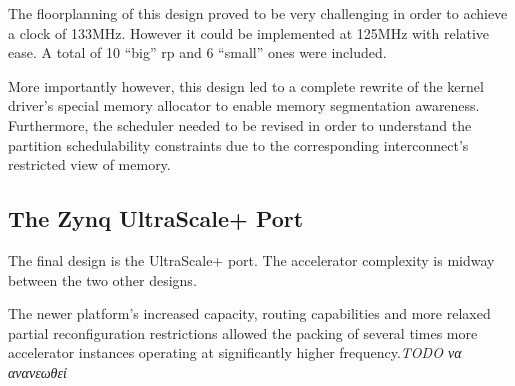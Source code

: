 The floorplanning of this design proved to be very challenging in order to achieve a clock of 133MHz.
However it could be implemented at 125MHz with relative ease. A total of 10 ``big'' \gls{rp} and
6 ``small'' ones were included.

More importantly however, this design led to a complete rewrite of the kernel driver's special memory allocator
to enable memory segmentation awareness. Furthermore, the scheduler needed to be revised in order to understand
the partition schedulability constraints due to the corresponding interconnect's restricted view of memory.


\subsection{The Zynq UltraScale+ Port}

The final design is the UltraScale+ port.
The accelerator complexity is midway between the two other designs. 

The newer platform's increased capacity, routing capabilities 
and more relaxed partial reconfiguration restrictions
allowed the packing of several times more accelerator instances
operating at significantly higher frequency.\emph{TODO να ανανεωθεί}


